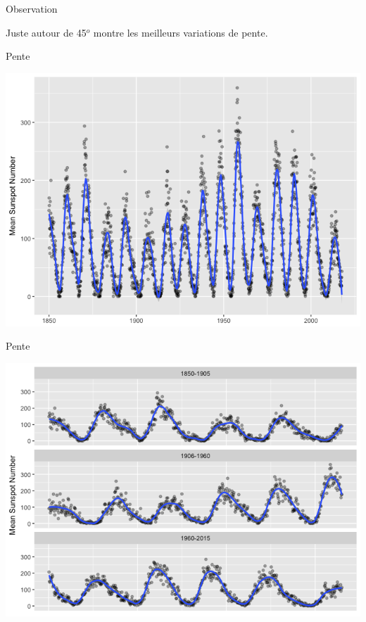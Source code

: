 \documentclass[french]{beamer}
\begin{document}
\begin{frame}{Observation}
\begin{Large}
	Juste autour de 45$^o$ montre les meilleurs variations de pente.
\end{Large}
\end{frame}

\begin{frame}{Pente}
\begin{center}
	\includegraphics[height=0.8\textheight]{signal_dense}
\end{center}
\end{frame}

\begin{frame}{Pente}
\begin{center}
	\includegraphics[height=0.8\textheight]{signal_45}
\end{center}
\end{frame}
\end{document}
